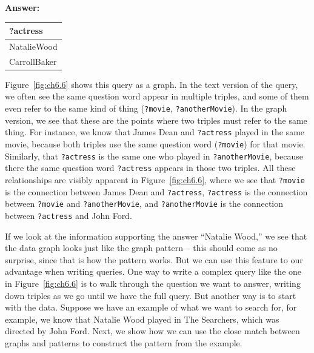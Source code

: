 \textbf{\textbf{Answer:}}

\begin{tabular}{|l|}
\hline
?actress\\
\hline
NatalieWood\\
CarrollBaker\\
\hline
\end{tabular}

Figure~\ref{fig:ch6.6} shows this query as a graph. In the text version of the
query, we often see the same question word appear in multiple triples,
and some of them even refer to the same kind of thing (\texttt{?movie},
\texttt{?anotherMovie}). In the graph version, we see that these are the points
where two triples must refer to the same thing. For instance, we know
that James Dean and \texttt{?actress} played in the same movie, because both
triples use the same question word (\texttt{?movie}) for that movie. Similarly,
that \texttt{?actress} is the same one who played in \texttt{?anotherMovie}, because there
the same question word \texttt{?actress} appears in those two triples. All these
relationships are visibly apparent in Figure~\ref{fig:ch6.6}, where we see that
\texttt{?movie} is the connection between James Dean and \texttt{?actress}, \texttt{?actress} is
the connection between \texttt{?movie} and \texttt{?anotherMovie}, and \texttt{?anotherMovie} is
the connection between \texttt{?actress} and John Ford.

If we look at the information supporting the answer ``Natalie Wood,'' we
see that the data graph looks just like the graph pattern -- this should
come as no surprise, since that is how the pattern works. But we can use
this feature to our advantage when writing queries. One way to write a
complex query like the one in Figure~\ref{fig:ch6.6} is to walk through the question
we want to answer, writing down triples as we go until we have the full query. But another way is to start with the
data. Suppose we have an example of what we want to search for, for
example, we know that Natalie Wood played in The Searchers, which was
directed by John Ford. Next, we show how we can use the close match
between graphs and patterns to construct the pattern from the example.



